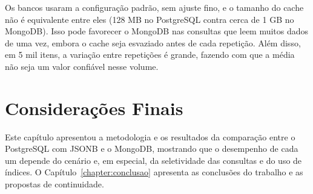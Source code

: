 Os bancos usaram a configuração padrão, sem ajuste fino, e o tamanho do cache não é equivalente entre eles (128 MB no PostgreSQL contra cerca de 1 GB no MongoDB). Isso pode favorecer o MongoDB nas consultas que leem muitos dados de uma vez, embora o cache seja esvaziado antes de cada repetição.
Além disso, em 5 mil itens, a variação entre repetições é grande, fazendo com que a média não seja um valor confiável nesse volume.


\section{Considerações Finais}
\label{sec:consideracoes-finais-dev}

Este capítulo apresentou a metodologia e os resultados da comparação entre o
PostgreSQL com JSONB e o MongoDB, mostrando que o desempenho de cada um depende do
cenário e, em especial, da seletividade das consultas e do uso de índices. O
Capítulo~\ref{chapter:conclusao} apresenta as conclusões do trabalho e as
propostas de continuidade.
